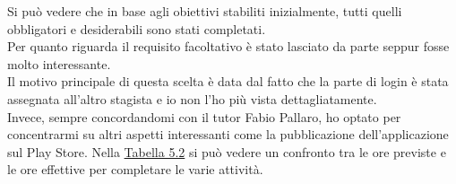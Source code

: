Si può vedere che in base agli obiettivi stabiliti inizialmente, tutti quelli obbligatori e desiderabili sono stati completati.\\
Per quanto riguarda il requisito facoltativo è stato lasciato da parte seppur fosse molto interessante.\\
Il motivo principale di questa scelta è data dal fatto che la parte di login è stata assegnata all'altro stagista e io non l'ho più vista dettagliatamente.\\
Invece, sempre concordandomi con il tutor Fabio Pallaro, ho optato per concentrarmi su altri aspetti interessanti come la pubblicazione dell'applicazione sul Play Store.
Nella \hyperref[tab:Confronto tra ore previste e ore effettive]{Tabella 5.2} si può vedere un confronto tra le ore previste e le ore effettive per completare le varie attività.

